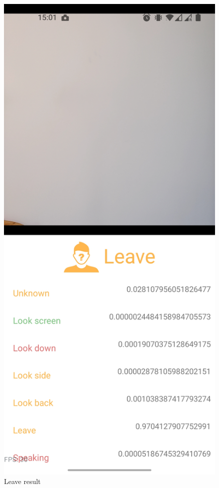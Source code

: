 \begin{minipage}{.5\textwidth}
\begin{figure}[H]
    \centering
    \includegraphics[width=\textwidth]{appendix/imgs/app-core-leave.jpg}
    \caption{Leave result}
    \label{fig:app-core-leave}
\end{figure}
\end{minipage}
